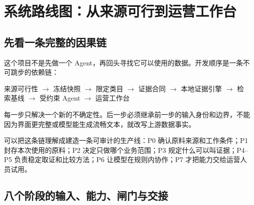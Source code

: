 \chapter{系统路线图：从来源可行到运营工作台}

\section{先看一条完整的因果链}

这个项目不是先做一个 Agent，再回头寻找它可以使用的数据。开发顺序是一条不可跳步的依赖链：

\begin{center}
来源可行性 $\rightarrow$ 冻结快照 $\rightarrow$ 限定类目 $\rightarrow$ 证据合同 $\rightarrow$
本地证据引擎 $\rightarrow$ 检索基线 $\rightarrow$ 受约束 Agent $\rightarrow$ 运营工作台
\end{center}

每一步只解决一个新的不确定性。后一步必须继承前一步的输入身份和边界，不能因为界面更完整或模型能生成流畅文本，就改写上游数据事实。

\begin{beginnerbox}
可以把这条链理解成建造一条可审计的生产线：P0 确认原料来源和工作条件；P1 封存本次使用的原料；P2 决定只做哪个业务范围；P3 规定什么可以叫证据；P4--P5 负责稳定取证和比较方法；P6 让模型在规则内协作；P7 才把能力交给运营人员试用。
\end{beginnerbox}

\section{八个阶段的输入、能力、闸门与交接}

